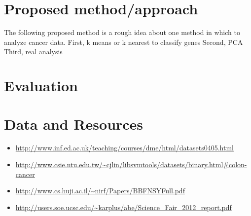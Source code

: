 \documentclass[11pt]{amsart}
\begin{document}
\section{Proposed method/approach}
The following proposed method is a rough idea about one method in which to analyze cancer data.
First, k means or k nearest to classify genes
Second, PCA
Third, real analysis

\section{Evaluation}

\section{Data and Resources}
\begin{itemize}
\item \url{http://www.inf.ed.ac.uk/teaching/courses/dme/html/datasets0405.html}
\item \url{http://www.csie.ntu.edu.tw/~cjlin/libsvmtools/datasets/binary.html#colon-cancer}
\item \url{http://www.cs.huji.ac.il/~nirf/Papers/BBFNSYFull.pdf}
\item \url{http://users.soe.ucsc.edu/~karplus/abe/Science_Fair_2012_report.pdf}
\end{itemize}

\end{document}
